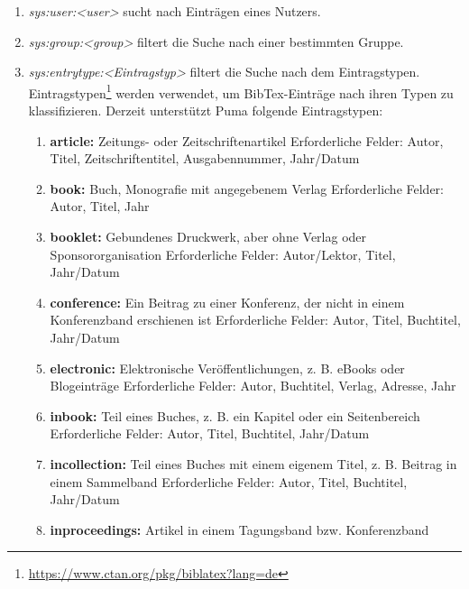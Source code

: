 \begin{description}
\begin{enumerate}
    \item \textit{sys:user:<user>} sucht nach Einträgen eines Nutzers.
    \item \textit{sys:group:<group>} filtert die Suche nach einer bestimmten Gruppe.
    \item \textit{sys:entrytype:<Eintragstyp>} filtert die Suche nach dem Eintragstypen. Eintragstypen\footnote{\url{https://www.ctan.org/pkg/biblatex?lang=de}} werden verwendet, um BibTex-Einträge nach ihren Typen zu klassifizieren. Derzeit unterstützt Puma folgende Eintragstypen: 
    \begin{enumerate}
        \item \textbf{article:} Zeitungs- oder Zeitschriftenartikel\newline
        Erforderliche Felder: Autor, Titel, Zeitschriftentitel, Ausgabennummer, Jahr/Datum 
        \item \textbf{book:} Buch, Monografie mit angegebenem Verlag\newline
        Erforderliche Felder: Autor, Titel, Jahr
        \item \textbf{booklet:} Gebundenes Druckwerk, aber ohne Verlag oder Sponsororganisation\newline
        Erforderliche Felder: Autor/Lektor, Titel, Jahr/Datum
        \item \textbf{conference:} Ein Beitrag zu einer Konferenz, der nicht in einem Konferenzband erschienen ist\newline
        Erforderliche Felder: Autor, Titel, Buchtitel, Jahr/Datum
        \item \textbf{electronic:} Elektronische Veröffentlichungen, z. B. eBooks oder Blogeinträge\newline 
        Erforderliche Felder: Autor, Buchtitel, Verlag, Adresse, Jahr
        \item \textbf{inbook:} Teil eines Buches, z. B. ein Kapitel oder ein Seitenbereich\newline
        Erforderliche Felder: Autor, Titel, Buchtitel, Jahr/Datum 
        \item \textbf{incollection:} Teil eines Buches mit einem eigenem Titel, z. B. Beitrag in einem Sammelband\newline
        Erforderliche Felder: Autor, Titel, Buchtitel, Jahr/Datum
        \item \textbf{inproceedings:} Artikel in einem Tagungsband bzw. Konferenzband\newline

\end{enumerate}
\end{enumerate}
\end{description}
